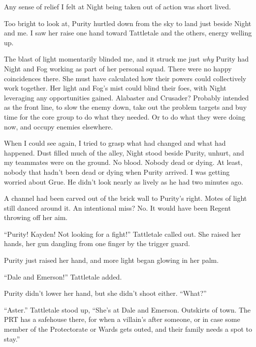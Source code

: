 Any sense of relief I felt at Night being taken out of action was short lived.



Too bright to look at, Purity hurtled down from the sky to land just beside Night and me.  I saw her raise one hand toward Tattletale and the others, energy welling up.



The blast of light momentarily blinded me, and it struck me just \emph{why} Purity had Night and Fog working as part of her personal squad.  There were no happy coincidences there.  She must have calculated how their powers could collectively work together.  Her light and Fog's mist could blind their foes, with Night leveraging any opportunities gained.  Alabaster and Crusader?  Probably intended as the front line, to slow the enemy down, take out the problem targets and buy time for the core group to do what they needed.  Or to do what they were doing now, and occupy enemies elsewhere.



When I could see again, I tried to grasp what had changed and what had happened.  Dust filled much of the alley, Night stood beside Purity, unhurt, and my teammates were on the ground.  No blood.  Nobody dead or dying.  At least, nobody that hadn't been dead or dying when Purity arrived.  I was getting worried about Grue.  He didn't look nearly as lively as he had two minutes ago.



A channel had been carved out of the brick wall to Purity's right.  Motes of light still danced around it.  An intentional miss?  No.  It would have been Regent throwing off her aim.



``Purity!  Kayden!  Not looking for a fight!'' Tattletale called out.  She raised her hands, her gun dangling from one finger by the trigger guard.



Purity just raised her hand, and more light began glowing in her palm.



``Dale and Emerson!''  Tattletale added.



Purity didn't lower her hand, but she didn't shoot either.  ``What?''



``Aster.''  Tattletale stood up, ``She's at Dale and Emerson.  Outskirts of town.  The PRT has a safehouse there, for when a villain's after someone, or in case some member of the Protectorate or Wards gets outed, and their family needs a spot to stay.''



